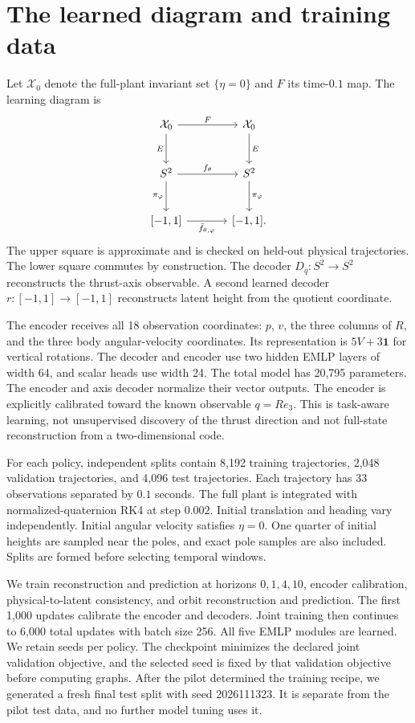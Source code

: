 \documentclass[11pt]{article}
\begin{document}
\section{The learned diagram and training data}
Let $\mathcal X_0$ denote the full-plant invariant set $\{\eta=0\}$ and $F$ its time-$0.1$ map. The learning diagram is
\[
\begin{tikzcd}[column sep=large,row sep=large]
 \mathcal X_0\arrow[r,"F"]\arrow[d,"E"']&\mathcal X_0\arrow[d,"E"]\\
 S^2\arrow[r,"f_\theta"]\arrow[d,"\pi_\varphi"']&S^2\arrow[d,"\pi_\varphi"]\\
 {[-1,1]}\arrow[r,"\bar f_{\theta,\varphi}"']&{[-1,1]}.
\end{tikzcd}
\]
The upper square is approximate and is checked on held-out physical trajectories. The lower square commutes by construction. The decoder $D_q\colon S^2\to S^2$ reconstructs the thrust-axis observable. A second learned decoder $r\colon[-1,1]\to[-1,1]$ reconstructs latent height from the quotient coordinate.

The encoder receives all 18 observation coordinates: $p$, $v$, the three columns of $R$, and the three body angular-velocity coordinates. Its representation is $5V+3\mathbf1$ for vertical rotations. The decoder and encoder use two hidden EMLP layers of width 64, and scalar heads use width 24. The total model has 20,795 parameters. The encoder and axis decoder normalize their vector outputs. The encoder is explicitly calibrated toward the known observable $q=Re_3$. This is task-aware learning, not unsupervised discovery of the thrust direction and not full-state reconstruction from a two-dimensional code.

For each policy, independent splits contain 8,192 training trajectories, 2,048 validation trajectories, and 4,096 test trajectories. Each trajectory has 33 observations separated by $0.1$ seconds. The full plant is integrated with normalized-quaternion RK4 at step $0.002$. Initial translation and heading vary independently. Initial angular velocity satisfies $\eta=0$. One quarter of initial heights are sampled near the poles, and exact pole samples are also included. Splits are formed before selecting temporal windows.

We train reconstruction and prediction at horizons $0,1,4,10$, encoder calibration, physical-to-latent consistency, and orbit reconstruction and prediction. The first 1,000 updates calibrate the encoder and decoders. Joint training then continues to 6,000 total updates with batch size 256. All five EMLP modules are learned. We retain \seedcount{} seeds per policy. The checkpoint minimizes the declared joint validation objective, and the selected seed is fixed by that validation objective before computing graphs. After the pilot determined the training recipe, we generated a fresh final test split with seed 2026111323. It is separate from the pilot test data, and no further model tuning uses it.
\end{document}
